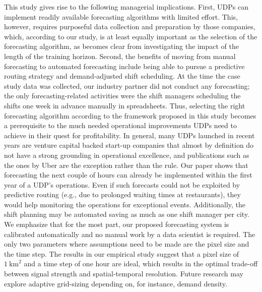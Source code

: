 This study gives rise to the following managerial implications.
First, UDPs can implement readily available forecasting algorithms with limited
    effort.
This, however, requires purposeful data collection and preparation by those
    companies, which, according to our study, is at least equally important as
    the selection of the forecasting algorithm, as becomes clear from 
    investigating the impact of the length of the training horizon.
Second, the benefits of moving from manual forecasting to automated forecasting
    include being able to pursue a predictive routing strategy and
    demand-adjusted shift scheduling.
At the time the case study data was collected, our industry partner did not
    conduct any forecasting; the only forecasting-related activities were the
    shift managers scheduling the shifts one week in advance manually in 
    spreadsheets.
Thus, selecting the right forecasting algorithm according to the framework
    proposed in this study becomes a prerequisite to the much needed
    operational improvements UDPs need to achieve in their quest for
    profitability.
In general, many UDPs launched in recent years are venture capital backed
    start-up companies that almost by definition do not have a strong
    grounding in operational excellence, and publications such as the ones by
    Uber are the exception rather than the rule.
Our paper shows that forecasting the next couple of hours can already be
    implemented within the first year of a UDP's operations.
Even if such forecasts could not be exploited by predictive routing (e.g., due
    to prolonged waiting times at restaurants), they would help monitoring the
    operations for exceptional events.
Additionally, the shift planning may be automated saving as much as one shift
    manager per city.
We emphasize that for the most part, our proposed forecasting system
    is calibrated automatically and no manual work by a data scientist is required.
The only two parameters where assumptions need to be made are the pixel size
    and the time step.
The results in our empirical study suggest
    that a pixel size of $1~\text{km}^2$ and a time step of one hour are ideal,
    which results in the optimal trade-off
    between signal strength and spatial-temporal resolution.
Future research may explore adaptive grid-sizing depending on, for instance, demand density.